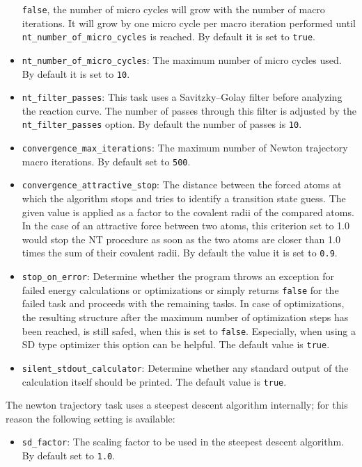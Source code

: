 \documentclass[]{tufte-book}
\begin{document}
\begin{itemize}
\texttt{false}, the number of micro cycles will grow with the number of macro iterations. It will grow by one micro
cycle per macro iteration performed until \texttt{nt\_number\_of\_micro\_cycles} is reached. By default it is set to \texttt{true}.
\item \texttt{nt\_number\_of\_micro\_cycles}: The maximum number of micro cycles used. By default it is set to \texttt{10}.
\item \texttt{nt\_filter\_passes}: This task uses a Savitzky--Golay filter before analyzing the reaction curve. The number of passes
through this filter is adjusted by the \texttt{nt\_filter\_passes} option. By default the number of passes is \texttt{10}.
\item \texttt{convergence\_max\_iterations}: The maximum number of Newton trajectory macro iterations. By default set to \texttt{500}.
\item \texttt{convergence\_attractive\_stop}: The distance between the forced atoms at which the algorithm stops and tries to identify
a transition state guess. The given value is applied as a factor to the covalent radii of the compared atoms.
In the case of an attractive force between two atoms, this criterion set to 1.0 would stop the NT procedure as soon as the two atoms
are closer than 1.0 times the sum of their covalent radii.
By default the value it is set to \texttt{0.9}.
\item \texttt{stop\_on\_error}: Determine whether the program throws an exception for failed energy calculations or optimizations or simply returns \texttt{false} for the failed task and proceeds with the remaining tasks. In case of optimizations, the resulting structure after the maximum number of optimization steps has been reached, is still safed, when this is set to \texttt{false}. Especially, when using a SD type optimizer this option can be helpful. The default value is \texttt{true}.
\item \texttt{silent\_stdout\_calculator}: Determine whether any standard output of the calculation itself should be printed. The default value is \texttt{true}.
\end{itemize}

The newton trajectory task uses a steepest descent algorithm internally; for this reason the following setting is available:
\begin{itemize}
\item \texttt{sd\_factor}: The scaling factor to be used in the steepest descent algorithm. By default set to \texttt{1.0}.
\end{itemize}
\end{document}
